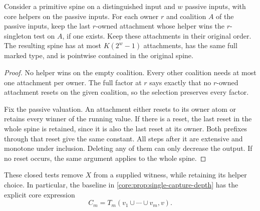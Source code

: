 \begin{lemma}
\label{core:lem:spine-last-resets}
Consider a primitive spine on a distinguished input and $w$ passive
inputs, with core helpers on the passive inputs. For each owner $r$
and coalition $A$ of the passive inputs, keep the last $r$-owned
attachment whose helper wins the $r$-singleton test on $A$, if one
exists. Keep these attachments in their original order. The resulting
spine has at most $K(2^w-1)$ attachments, has the same full marked
type, and is pointwise contained in the original spine.
\end{lemma}
\begin{proof}
No helper wins on the empty coalition. Every other coalition needs
at most one attachment per owner. The full factor at $r$ says exactly
that no $r$-owned attachment resets on the given coalition, so the
selection preserves every factor.

Fix the passive valuation. An attachment either resets to its
owner atom or retains every winner of the running value. If there is
a reset, the last reset in the whole spine is retained, since it is
also the last reset at its owner. Both prefixes through that reset
give the same constant. All steps after it are extensive and monotone
under inclusion. Deleting any of them can only decrease the output.
If no reset occurs, the same argument applies to the whole spine.
\end{proof}

These closed tests remove $X$ from a supplied witness, while retaining
its helper choice. In particular, the baseline in
\cref{core:prop:single-capture-depth} has the explicit core expression
\[
 C_m=T_m(v_1\cup\cdots\cup v_m,v).
\]

